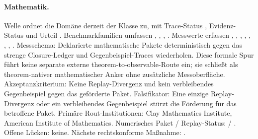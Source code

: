 \paragraph{Mathematik.}
Welle  ordnet die Domäne derzeit der Klasse  zu, mit Trace-Status , Evidenz-Status  und Urteil .
Benchmarkfamilien umfassen , \allowbreak {}, \allowbreak {}, \allowbreak {}.
Messwerte erfassen , \allowbreak {}, \allowbreak {}, \allowbreak {}, \allowbreak {}, \allowbreak {}, \allowbreak {}, \allowbreak {}.
Messschema: Deklarierte mathematische Pakete deterministisch gegen das strenge Closure-Ledger und Gegenbeispiel-Traces wiederholen.
Diese formale Spur führt keine separate externe theorem-to-observable-Route ein; sie schließt als theorem-nativer mathematischer Anker ohne zusätzliche Messoberfläche.
Akzeptanzkriterium: Keine Replay-Divergenz und kein verbleibendes Gegenbeispiel gegen das geförderte Paket.
Falsifikator: Eine einzige Replay-Divergenz oder ein verbleibendes Gegenbeispiel stürzt die Förderung für das betroffene Paket.
Primäre Rout-Institutionen: Clay Mathematics Institute, \allowbreak American Institute of Mathematics.
Numerisches Paket / Replay-Status:  / .
Offene Lücken: keine.
Nächste rechtskonforme Maßnahme: .

